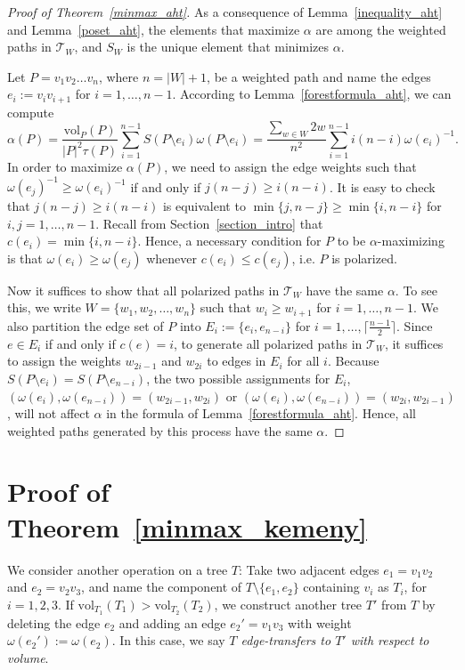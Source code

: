 \documentclass[11pt]{article}
\theoremstyle{definition}
\newcommand{\vol}{\text{vol}}
\begin{document}
\begin{proof}[Proof of Theorem~\ref{minmax_aht}]
As a consequence of Lemma~\ref{inequality_aht} and Lemma~\ref{poset_aht}, the elements that maximize $\alpha$ are among the weighted paths in $\mathcal{T}_W$, and $S_W$ is the unique element that minimizes $\alpha$.

Let $P=v_1v_2\dots v_n$, where $n=|W|+1$, be a weighted path and name the edges $e_i:=v_iv_{i+1}$ for $i=1,\dots,n-1$. According to Lemma~\ref{forestformula_aht}, we can compute
\[\alpha(P)=\frac{\vol_P(P)}{|P|^2\tau(P)}\sum_{i=1}^{n-1}S(P\setminus e_i)\omega(P\setminus e_i)=\frac{\sum_{w\in W} 2w}{n^2}\sum_{i=1}^{n-1}i(n-i)\omega(e_i)^{-1}.\]
In order to maximize $\alpha(P)$, we need to assign the edge weights such that $\omega(e_j)^{-1}\geq \omega(e_i)^{-1}$ if and only if $j(n-j)\geq i(n-i)$. It is easy to check that $j(n-j)\geq i(n-i)$ is equivalent to $\min\{j,n-j\}\geq \min\{i,n-i\}$ for $i,j=1,\dots,n-1$. Recall from Section~\ref{section_intro} that $c(e_i)=\min\{i,n-i\}$. Hence, a necessary condition for $P$ to be $\alpha$-maximizing is that $\omega(e_i)\geq \omega(e_j)$ whenever $c(e_i)\leq c(e_j)$, i.e. $P$ is polarized.

Now it suffices to show that all polarized paths in $\mathcal{T}_W$ have the same $\alpha$. To see this, we write $W=\{w_1,w_2,\dots, w_n\}$ such that $w_i\geq w_{i+1}$ for $i=1,\dots,n-1$. We also partition the edge set of $P$ into $E_i:=\{e_i,e_{n-i}\}$ for $i=1,\dots, \lceil \frac{n-1}{2} \rceil$. Since $e\in E_i$ if and only if $c(e)=i$, to generate all polarized paths in $\mathcal{T}_W$, it suffices to assign the weights $w_{2i-1}$ and $w_{2i}$ to edges in $E_i$ for all $i$. Because $S(P\setminus e_i)=S(P\setminus e_{n-i})$, the two possible assignments for $E_i$, $(\omega(e_i),\omega(e_{n-i}))=(w_{2i-1},w_{2i})$ or $(\omega(e_i),\omega(e_{n-i}))=(w_{2i},w_{2i-1})$, will not affect $\alpha$ in the formula of Lemma~\ref{forestformula_aht}. Hence, all weighted paths generated by this process have the same $\alpha$.
\end{proof}

\section{Proof of Theorem~\ref{minmax_kemeny}}\label{section_kemeny}
We consider another operation on a tree $T$: Take two adjacent edges $e_1=v_1v_2$ and $e_2=v_2v_3$, and name the component of $T\setminus\{e_1,e_2\}$ containing $v_i$ as $T_i$, for $i=1,2,3$. If $\vol_{T_1}(T_1)>\vol_{T_2}(T_2)$, we construct another tree $T'$ from $T$ by deleting the edge $e_2$ and adding an edge $e_2'=v_1v_3$ with weight $\omega(e_2'):=\omega(e_2)$. In this case, we say \emph{$T$ edge-transfers to $T'$ with respect to volume}.
\end{document}
